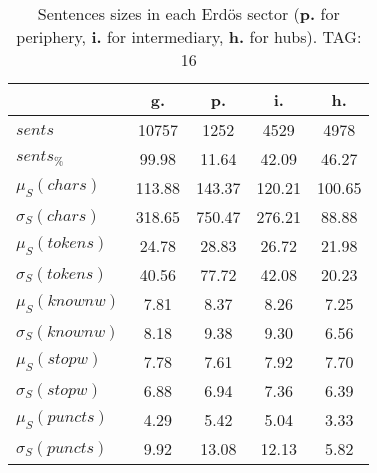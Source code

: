 \begin{table}[h!]
\begin{center}
\begin{tabular}{| l || c | c | c | c |}\hline
 & {\bf g.} & {\bf p.} & {\bf i.} & {\bf h.} \\\hline\hline
$sents$ & 10757  & 1252  & 4529  & 4978 \\
$sents_{\%}$ & 99.98  & 11.64  & 42.09  & 46.27 \\\hline
$\mu_S(chars)$ & 113.88  & 143.37  & 120.21  & 100.65 \\
$\sigma_S(chars)$ & 318.65  & 750.47  & 276.21  & 88.88 \\\hline
$\mu_S(tokens)$ & 24.78  & 28.83  & 26.72  & 21.98 \\
$\sigma_S(tokens)$ & 40.56  & 77.72  & 42.08  & 20.23 \\\hline
$\mu_S(knownw)$ & 7.81  & 8.37  & 8.26  & 7.25 \\
$\sigma_S(knownw)$ & 8.18  & 9.38  & 9.30  & 6.56 \\\hline
$\mu_S(stopw)$ & 7.78  & 7.61  & 7.92  & 7.70 \\
$\sigma_S(stopw)$ & 6.88  & 6.94  & 7.36  & 6.39 \\\hline
$\mu_S(puncts)$ & 4.29  & 5.42  & 5.04  & 3.33 \\
$\sigma_S(puncts)$ & 9.92  & 13.08  & 12.13  & 5.82 \\\hline
\end{tabular}
	\caption{Sentences sizes in each Erd\"os sector ({{\bf p.}} for periphery, {{\bf i.}} for intermediary, {{\bf h.}} for hubs). TAG: 16}\label{tab:sizesSents}
\end{center}
\end{table}
